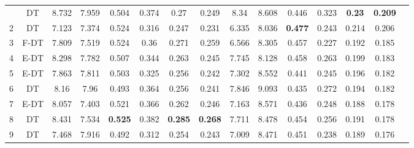 \begin{longtable}{@{\hskip3pt}c@{\hskip3pt}c@{\hskip3pt}c@{\hskip3pt}c@{\hskip3pt}c@{\hskip3pt}c@{\hskip3pt}c@{\hskip3pt}c@{\hskip3pt}c@{\hskip3pt}c@{\hskip3pt}c@{\hskip3pt}c@{\hskip3pt}c@{\hskip3pt}c@{\hskip3pt}c}
\bottomrule
\endlastfoot
          1\label{tab:all-results-final} &             DT &             8.732 &       7.959 &           0.504 &           0.374 &            0.27 &           0.249 &                8.34 &       8.608 &           0.446 &         0.323 &  \textbf{0.23} &  \textbf{0.209} \\
          2 &             DT &             7.123 &       7.374 &           0.524 &           0.316 &           0.247 &           0.231 &               6.335 &       8.036 &  \textbf{0.477} &         0.243 &          0.214 &           0.206 \\
          3 &           F-DT &             7.809 &       7.519 &           0.524 &            0.36 &           0.271 &           0.259 &               6.566 &       8.305 &           0.457 &         0.227 &          0.192 &           0.185 \\
          4 &           E-DT &             8.298 &       7.782 &           0.507 &           0.344 &           0.263 &           0.245 &               7.745 &       8.128 &           0.458 &         0.263 &          0.199 &           0.183 \\
          5 &           E-DT &             7.863 &       7.811 &           0.503 &           0.325 &           0.256 &           0.242 &               7.302 &       8.552 &           0.441 &         0.245 &          0.196 &           0.182 \\
          6 &             DT &              8.16 &        7.96 &           0.493 &           0.364 &           0.256 &           0.241 &               7.846 &       9.093 &           0.435 &         0.272 &          0.194 &           0.182 \\
          7 &           E-DT &             8.057 &       7.403 &           0.521 &           0.366 &           0.262 &           0.246 &               7.163 &       8.571 &           0.436 &         0.248 &          0.188 &           0.178 \\
          8 &             DT &             8.431 &       7.534 &  \textbf{0.525} &           0.382 &  \textbf{0.285} &  \textbf{0.268} &               7.711 &       8.478 &           0.454 &         0.256 &          0.191 &           0.178 \\
          9 &             DT &             7.468 &       7.916 &           0.492 &           0.312 &           0.254 &           0.243 &               7.009 &       8.471 &           0.451 &         0.238 &          0.189 &           0.176 \\

\end{longtable}
